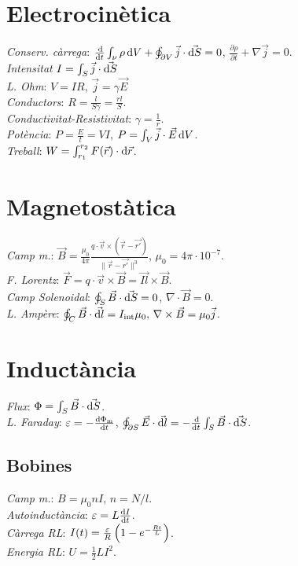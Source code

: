 \section{Electrocinètica}
\emph{Conserv. càrrega}: $\frac{\dif}{\dif t} \int_\nu \rho \dif V + 
                          \oint_{\partial V} \vec{j} \cdot \vec{\dif S} = 0$,
                          $\frac{\partial\rho}{\partial t} + \nabla \vec{j} = 0 $.\\
\emph{Intensitat} $I = \int_S \vec{j} \cdot \vec{\dif S}$\\
\emph{L. Ohm}: $V=IR$, $\vec{j} = \gamma \vec{E}$\\
\emph{Conductors}: $R = \frac{l}{S\gamma} = \frac{rl}{S}$. \\
\emph{Conductivitat-Resistivitat}: $\gamma = \frac{1}{r}$. \\
\emph{Potència}: $P=\frac{E}{t}=VI$, $P = \int_{V} \vec{j} \cdot \vec{E} \dif V$. \\
\emph{Treball}: $W=\int_{r_1}^{r_2} F(\vec{r}) \cdot \dif \vec{r}$.

\section{Magnetostàtica}
\emph{Camp m.}: $\vec{B} = \frac{\mu_0}{4\pi}\frac{q\cdot \vec{v}\times (\vec{r} - \vec{r'})}{\|\vec{r} -\vec{r'}\|^3}$, $\mu_0=4\pi \cdot 10^{-7}$. \\
\emph{F. Lorentz}: $\vec{F} = q \cdot\vec{v}\times\vec{B} = \vec{Il} \times \vec{B}$. \\

\emph{Camp Solenoidal}: $\oint_S \vec{B} \cdot \vec{\dif S} = 0$, $\nabla \cdot \vec{B} = 0$.\\
\emph{L. Ampère}: $\oint_C \vec{B}\cdot \vec{\dif l} = I_{\text{int}} \mu_0, \, \nabla \times \vec{B} = \mu_0 \vec{j}$.

\section{Inductància}
\emph{Flux}: $\Phi = \int_S \vec{B}\cdot \vec{\dif S}$. \\
\emph{L. Faraday}: $\varepsilon = -\frac{\dif \Phi_{\text{m}}}{\dif t}$, $\oint_{\partial S} \vec{E} \cdot \vec{\dif l} = -\frac{\dif}{\dif t}\int_S \vec{B} \cdot \vec{\dif S}$.
\subsection{Bobines}
\emph{Camp m.}: $B = \mu_0 n I$, $n = N/l$.\\
\emph{Autoinductància}: $\varepsilon = L \frac{\dif I}{\dif t}$.\\
\emph{Càrrega RL}: $I(t) = \frac{\varepsilon}{R} \left( 1 - e^{-\frac{Rt}{L}}\right)$.\\
\emph{Energia RL}: $U = \frac{1}{2}LI^2$.

